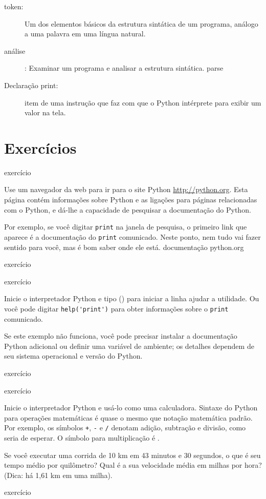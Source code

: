 \documentclass[10pt]{book}
\begin{document}
\begin{description}
\item[token:] Um dos elementos básicos da estrutura sintática de
um programa, análogo a uma palavra em uma língua natural.

\item[análise]: Examinar um programa e analisar a estrutura sintática.
\index{} parse

\item[Declaração print:] item de uma instrução que faz com que o Python
intérprete para exibir um valor na tela.


\end{description}


\section{Exercícios}

\begin{} exercício

Use um navegador da web para ir para o site Python \url{http://python.org}.
Esta página contém informações sobre Python e as ligações
para páginas relacionadas com o Python, e dá-lhe a capacidade de pesquisar
a documentação do Python.

Por exemplo, se você digitar {\tt print} na janela de pesquisa, o
primeiro link que aparece é a documentação do {\tt print}
comunicado. Neste ponto, nem tudo vai fazer sentido para você,
mas é bom saber onde ele está.
\index{} documentação
\index{} python.org

\end{} exercício

\begin{} exercício

Inicie o interpretador Python e tipo {\ttajuda()} para iniciar a linha
ajudar a utilidade. Ou você pode digitar \verb"help('print')" para obter informações
sobre o {\tt print} comunicado.

Se este exemplo não funciona, você
pode precisar instalar a documentação Python adicional ou definir uma
variável de ambiente; os detalhes dependem de seu sistema operacional e
versão do Python.

\end{} exercício

\begin{} exercício

Inicie o interpretador Python e usá-lo como uma calculadora.
Sintaxe do Python para operações matemáticas é quase o mesmo que
notação matemática padrão. Por exemplo, os símbolos
{\tt +}, {\tt -} e {\tt /} denotam adição, subtração
e divisão, como seria de esperar. O símbolo para
multiplicação é {\tt *}.

Se você executar uma corrida de 10 km em 43 minutos e 30 segundos, o que é seu
tempo médio por quilômetro? Qual é a sua velocidade média em milhas por hora?
(Dica: há 1,61 km em uma milha).

\end{} exercício
\end{document}
